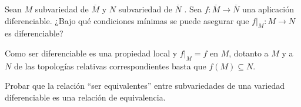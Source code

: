 \documentclass[twoside]{article}
\newcounter{ejercicio}
\begin{document}
\newpage

\begin{ejercicio}{12}
Sean $M$ subvariedad de $\overline{M}$ y $N$ subvariedad de $\overline{N}$ . Sea $f : \overline{M} \to \overline{N}$ una
aplicación diferenciable. ¿Bajo qué condiciones mínimas se puede asegurar
que $f|_M : M \to N$ es diferenciable?
\end{ejercicio}
\begin{solucion}
Como ser diferenciable es una propiedad local y $f|_M=f$ en $M$, dotanto a $M$ y a $N$ de las topologías relativas correspondientes basta que $f(M)\subseteq N$.
\end{solucion}

\newpage

\begin{ejercicio}{13}
Probar que la relación ``ser equivalentes'' entre subvariedades de una variedad
diferenciable es una relación de equivalencia.
\end{ejercicio}
\begin{solucion}
\end{solucion}

\newpage
\end{document}
